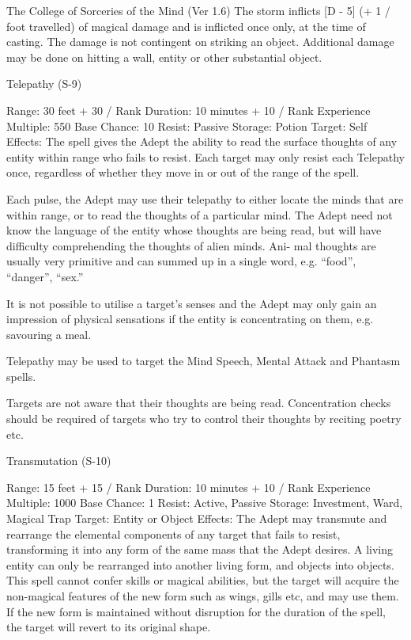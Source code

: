 \begin{Chapter}{The College of Sorceries of the Mind (Ver 1.6)}
The  storm  inflicts  [D  -  5]  (+  1  /  foot  travelled)  of 
magical  damage  and  is  inflicted  once  only,  at  the 
time  of  casting.  The  damage  is  not  contingent  on 
striking an object. Additional damage may be done 
on hitting a wall, entity or other substantial object. 

Telepathy (S-9) 

Range: 30 feet + 30 / Rank 
Duration: 10 minutes + 10 / Rank 
Experience Multiple: 550 
Base Chance: 10%
Resist: Passive 
Storage: Potion 
Target: Self 
Effects:  The  spell  gives  the  Adept  the  ability  to 
read the surface thoughts of any entity within range 
who fails to resist. Each target may only resist each 
Telepathy  once,  regardless  of  whether  they  move 
in or out of the range of the spell. 

Each  pulse,  the  Adept  may  use  their  telepathy  to 
either locate the minds that are within range, or to 
read  the  thoughts  of  a  particular  mind.  The  Adept 
need  not  know  the  language  of  the  entity  whose 
thoughts  are  being  read,  but  will  have  difficulty 
comprehending  the  thoughts  of  alien  minds.  Ani-
mal  thoughts  are  usually  very  primitive  and  can 
summed up in a single word, e.g. “food”, “danger”, 
“sex.” 

It is not possible to utilise a target’s senses and the 
Adept  may  only  gain  an  impression  of  physical 
sensations  if  the  entity  is  concentrating  on  them, 
e.g. savouring a meal. 

Telepathy may be used to  target the Mind Speech, 
Mental Attack and Phantasm spells. 

Targets are not aware that their thoughts are being 
read.  Concentration  checks  should  be  required  of 
targets who try to control their thoughts by reciting 
poetry etc. 

Transmutation (S-10) 

Range: 15 feet + 15 / Rank 
Duration: 10 minutes + 10 / Rank 
Experience Multiple: 1000 
Base Chance: 1%
Resist: Active, Passive 
Storage: Investment, Ward, Magical Trap 
Target: Entity or Object 
Effects:  The  Adept  may  transmute  and  rearrange 
the elemental components of any target that fails to 
resist,  transforming  it  into  any  form  of  the  same 
mass  that  the  Adept  desires.  A  living  entity  can 
only  be  rearranged  into  another  living  form,  and 
objects into objects. This spell cannot confer skills 
or  magical  abilities,  but  the  target  will  acquire  the 
non-magical  features  of  the  new  form  such  as 
wings, gills etc, and may use them. If the new form 
is maintained without disruption for the duration of 
the spell, the target will revert to its original shape. 

\end{Chapter}
